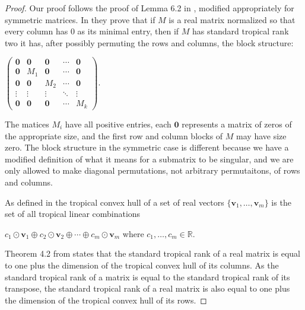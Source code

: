 \documentclass{article}
\begin{document}
\begin{proof}
  Our proof follows the proof of Lemma 6.2 in \cite{dss}, modified appropriately for symmetric matrices. In \cite{dss} they prove that if $M$ is a real matrix normalized so that every column has $0$ as its minimal entry, then if $M$ has standard tropical rank two it has, after possibly permuting the rows and columns, the block structure:
  
  \begin{center}
    
    $\left(\begin{array}{ccccc} \textbf{0} & \textbf{0} & \textbf{0} & \cdots & \textbf{0} \\ \textbf{0} & M_{1} & \textbf{0} & \cdots & \textbf{0} \\ \textbf{0} & \textbf{0} & M_{2} & \cdots & \textbf{0} \\ \vdots & \vdots & \vdots & \ddots & \vdots \\ \textbf{0} & \textbf{0} & \textbf{0} & \cdots & M_{k} \end{array}\right)$.
    
  \end{center}
  
  The matices $M_{i}$ have all positive entries, each $\textbf{0}$ represents a matrix of zeros of the appropriate size, and the first row and column blocks of $M$ may have size zero. The block structure in the symmetric case is different because we have a modified definition of what it means for a submatrix to be singular, and we are only allowed to make diagonal permutations, not arbitrary permutaitons, of rows and columns.
  
  As defined in \cite{ds} the tropical convex hull of a set of real vectors $\{\textbf{v}_{1},\ldots,\textbf{v}_{m}\}$ is the set of all tropical linear combinations
  
  \begin{center}
    
    $c_{1} \odot \textbf{v}_{1} \oplus c_{2} \odot \textbf{v}_{2} \oplus \cdots \oplus c_{m} \odot \textbf{v}_{m}$ \hspace{.1 in} where $c_{1},\ldots,c_{m} \in \mathbb{R}$.
    
  \end{center}
  
  Theorem 4.2 from \cite{dss} states that the standard tropical rank of a real matrix is equal to one plus the dimension of the tropical convex hull of its columns. As the standard tropical rank of a matrix is equal to the standard tropical rank of its transpose, the standard tropical rank of a real matrix is also equal to one plus the dimension of the tropical convex hull of its rows. 
  

\end{proof}
\end{document}
